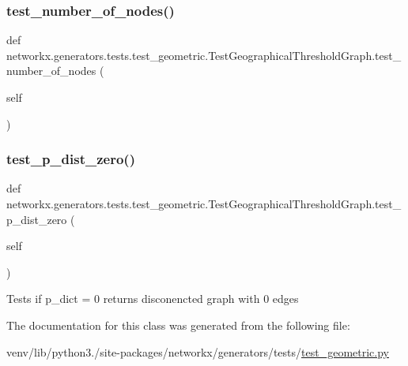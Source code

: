 \subsubsection{\texorpdfstring{test\+\_\+number\+\_\+of\+\_\+nodes()}{test\_number\_of\_nodes()}}
{\footnotesize\ttfamily def networkx.\+generators.\+tests.\+test\+\_\+geometric.\+Test\+Geographical\+Threshold\+Graph.\+test\+\_\+number\+\_\+of\+\_\+nodes (\begin{DoxyParamCaption}\item[{}]{self }\end{DoxyParamCaption})}

\mbox{\label{classnetworkx_1_1generators_1_1tests_1_1test__geometric_1_1TestGeographicalThresholdGraph_a4821fb233d568c66e017e9ad4626ab91}} 
\subsubsection{\texorpdfstring{test\+\_\+p\+\_\+dist\+\_\+zero()}{test\_p\_dist\_zero()}}
{\footnotesize\ttfamily def networkx.\+generators.\+tests.\+test\+\_\+geometric.\+Test\+Geographical\+Threshold\+Graph.\+test\+\_\+p\+\_\+dist\+\_\+zero (\begin{DoxyParamCaption}\item[{}]{self }\end{DoxyParamCaption})}

\begin{DoxyVerb}Tests if p_dict = 0 returns disconencted graph with 0 edges\end{DoxyVerb}
 

The documentation for this class was generated from the following file\+:\begin{DoxyCompactItemize}
\item 
venv/lib/python3./site-\/packages/networkx/generators/tests/\hyperlink{test__geometric_8py}{test\+\_\+geometric.\+py}\end{DoxyCompactItemize}

